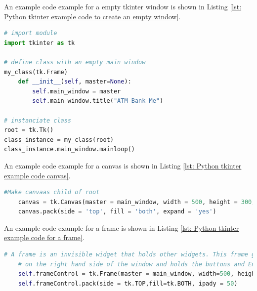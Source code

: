 An example code example for a empty tkinter window is shown in Listing \ref{lst: Python tkinter example code to create an empty window}.
\begin{lstlisting}[style=PythonStyle, language=Python, caption={Python tkinter example code to create an empty window.},label=lst: Python tkinter example code to create an empty window]
# import module
import tkinter as tk

# define class with an empty main window
my_class(tk.Frame)
    def __init__(self, master=None):
		self.main_window = master
		self.main_window.title("ATM Bank Me")

# instanciate class		
root = tk.Tk()
class_instance = my_class(root)
class_instance.main_window.mainloop()

\end{lstlisting}

An example code example for a canvas is shown in Listing \ref{lst: Python tkinter example code canvas}.
\begin{lstlisting}[style=PythonStyle, language=Python, caption={Python tkinter example code to create a canvas.},label=lst: Python tkinter example code canvas]
	#Make canvaas child of root
	canvas = tk.Canvas(master = main_window, width = 500, height = 300, bg = 'green')
	canvas.pack(side = 'top', fill = 'both', expand = 'yes')
\end{lstlisting}
An example code example for a frame is shown in Listing \ref{lst: Python tkinter example code for a frame}.
\begin{lstlisting}[style=PythonStyle, language=Python, caption={Python tkinter example code for a frame.},label=lst: Python tkinter example code for a frame ]
	# A frame is an invisible widget that holds other widgets. This frame goes 
	# on the right hand side of the window and holds the buttons and Entry widgets.
	self.frameControl = tk.Frame(master = main_window, width=500, height=100, background="green")
	self.frameControl.pack(side = tk.TOP,fill=tk.BOTH, ipady = 50)
\end{lstlisting}

